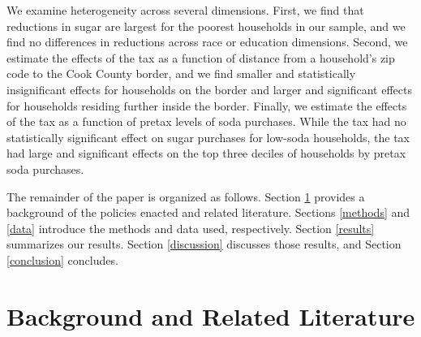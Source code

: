 \documentclass[12pt]{article}
\begin{document}
We examine heterogeneity across several dimensions. First, we find that reductions in sugar are largest for the poorest households in our sample, and we find no differences in reductions across race or education dimensions. Second, we estimate the effects of the tax as a function of distance from a household's zip code to the Cook County border, and we find smaller and statistically insignificant effects for households on the border and larger and significant effects for households residing further inside the border. Finally, we estimate the effects of the tax as a function of pretax levels of soda purchases. While the tax had no statistically significant effect on sugar purchases for low-soda households, the tax had large and significant effects on the top three deciles of households by pretax soda purchases.



The remainder of the paper is organized as follows. Section \ref{background} provides a background of the policies enacted and related literature. Sections \ref{methods} and \ref{data} introduce the methods and data used, respectively. Section \ref{results} summarizes our results. Section \ref{discussion} discusses those results, and Section \ref{conclusion} concludes.

\section{Background and Related Literature} \label{background}

\end{document}
